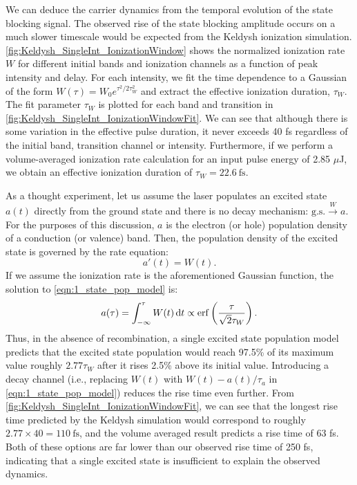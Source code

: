 We can deduce the carrier dynamics from the temporal evolution of the state blocking signal. The observed rise of the state blocking amplitude occurs on a much slower timescale would be expected from the Keldysh ionization simulation. \cref{fig:Keldysh_SingleInt_IonizationWindow} shows the normalized ionization rate $W$ for different initial bands and ionization channels as a function of peak intensity and delay. For each intensity, we fit the time dependence to a Gaussian of the form ${W(\tau)=W_0 e^{\tau^2/2\tau_W^2}}$ and extract the effective ionization duration, $\tau_W$. The fit parameter $\tau_W$ is plotted for each band and transition in \cref{fig:Keldysh_SingleInt_IonizationWindowFit}. We can see that although there is some variation in the effective pulse duration, it never exceeds 40 fs regardless of the initial band, transition channel or intensity. Furthermore, if we perform a volume-averaged ionization rate calculation for an input pulse energy of 2.85 $\mu$J, we obtain an effective ionization duration of $\tau_W = 22.6 \ \textrm{fs}$.

As a thought experiment, let us assume the laser populates an excited state $a(t)$ directly from the ground state and there is no decay mechanism: $\textrm{g.s.} \xrightarrow{W} a$. For the purposes of this discussion, $a$ is the electron (or hole) population density of a conduction (or valence) band. Then, the population density of the excited state is governed by the rate equation:
\begin{equation}
\label{eqn:1_state_pop_model}
a'(t) = W(t).
\end{equation}
If we assume the ionization rate is the aforementioned Gaussian function, the solution to \cref{eqn:1_state_pop_model} is:
\begin{equation}
a(\tau) = \int_{-\infty}^{\tau} W(t) \dd{t} \propto \erf\left(\frac{\tau}{\sqrt{2}\tau_W}\right).
\end{equation}
Thus, in the absence of recombination, a single excited state population model predicts that the excited state population would reach 97.5\% of its maximum value roughly $2.77\tau_W$ after it rises 2.5\% above its initial value. Introducing a decay channel (i.e., replacing $W(t)$ with ${W(t)-a(t)/\tau_a}$ in \cref{eqn:1_state_pop_model}) reduces the rise time even further. From \cref{fig:Keldysh_SingleInt_IonizationWindowFit}, we can see that the longest rise time predicted by the Keldysh simulation would correspond to roughly $2.77 \times 40 = 110 \ \textrm{fs}$, and the volume averaged result predicts a rise time of 63 fs. Both of these options are far lower than our observed rise time of 250 fs, indicating that a single excited state is insufficient to explain the observed dynamics.

